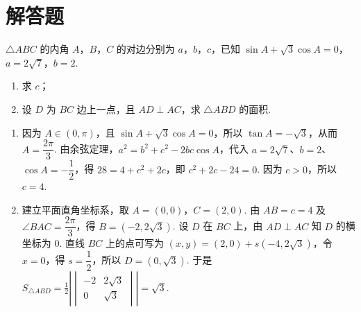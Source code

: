 \section{解答题}

\begin{problem}
\(\triangle ABC\) 的内角 \(A\)，\(B\)，\(C\) 的对边分别为 \(a\)，\(b\)，\(c\)，已知 \(\sin A+\sqrt3\cos A=0\)，\(a=2\sqrt7\)，\(b=2\).

\begin{enumerate}
\item 求 \(c\)；
\item 设 \(D\) 为 \(BC\) 边上一点，且 \(AD\perp AC\)，求 \(\triangle ABD\) 的面积.
\end{enumerate}
\end{problem}

\begin{solution}
\begin{enumerate}
\item 因为 \(A\in(0,\pi)\)，且 \(\sin A+\sqrt3\cos A=0\)，所以 \(\tan A=-\sqrt3\)，从而 \(A=\dfrac{2\pi}{3}\). 由余弦定理，\(a^2=b^2+c^2-2bc\cos A\)，代入 \(a=2\sqrt7\)、\(b=2\)、\(\cos A=-\dfrac12\)，得 \(28=4+c^2+2c\)，即 \(c^2+2c-24=0\). 因为 \(c>0\)，所以 \(c=4\).
\item 建立平面直角坐标系，取 \(A=(0,0)\)，\(C=(2,0)\). 由 \(AB=c=4\) 及 \(\angle BAC=\dfrac{2\pi}{3}\)，得 \(B=(-2,2\sqrt3)\). 设 \(D\) 在 \(BC\) 上，由 \(AD\perp AC\) 知 \(D\) 的横坐标为 \(0\). 直线 \(BC\) 上的点可写为 \((x,y)=(2,0)+s(-4,2\sqrt3)\)，令 \(x=0\)，得 \(s=\dfrac12\)，所以 \(D=(0,\sqrt3)\). 于是
\(S_{\triangle ABD}=\frac12\left|\begin{vmatrix}-2&2\sqrt3\\0&\sqrt3\end{vmatrix}\right|=\sqrt3\).
\end{enumerate}
\end{solution}

